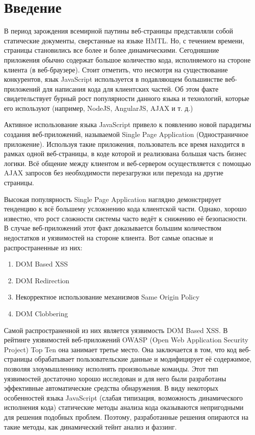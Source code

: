 
\chapter{Введение}\label{Introduction}

В период зарождения всемирной паутины веб-страницы представляли собой статические документы, сверстанные на языке HMTL. Но, с течением времени, страницы становились все более и более динамическими. Сегодняшние приложения обычно содержат большое количество кода, исполняемого на стороне клиента (в веб-браузере). Стоит отметить, что несмотря на существование конкурентов, язык JavaScript используется в подавляющем большинстве веб-приложений для написания кода для клиентских частей. Об этом факте свидетельствует бурный рост популярности данного языка и технологий, которые его используют (например, NodeJS, AngularJS, AJAX и т. д.)


Активное использование языка JavaScript привело к появлению новой парадигмы создания веб-приложений, называемой Single Page Application (Одностраничное приложение). Используя такие приложения, пользователь все время находится в рамках одной веб-страницы, в коде которой и реализована большая часть бизнес логики. Всё общение между клиентом и веб-сервером осуществляется с помощью AJAX запросов без необходимости перезагрузки или перехода на другие страницы.


Высокая популярность Single Page Application наглядно демонстрирует тенденцию к всё большему усложнению кода клиентской части. Однако, хорошо известно, что рост сложности системы часто ведёт к снижению её безопасности. В случае веб-приложений этот факт доказывается большим количеством недостатков и уязвимостей на стороне клиента. Вот самые опасные и распространенные из них:

\begin{enumerate}
	\item DOM Based XSS
	\item DOM Redirection
	\item Некорректное использование механизмов Same Origin Policy
	\item DOM Clobbering
\end{enumerate}


Самой распространенной из них является уязвимость DOM Based XSS. В рейтинге уязвимостей веб-приложений OWASP (Open Web Application Security Project) Top Ten она занимает третье место. Она заключается в том, что код веб-страницы обрабатывает пользовательские данные и модифицирует её содержимое, позволяя злоумышленнику исполнять произвольные команды. Этот тип уязвимостей достаточно хорошо исследован и для него были разработаны эффективные автоматические средства обнаружения. В виду некоторых особенностей языка JavaScript (слабая типизация, возможность динамического исполнения кода) статические методы анализа кода оказываются непригодными для решения подобных проблем. Поэтому, разработанные решения опираются на такие методы, как динамический тейнт анализ и фаззинг.


